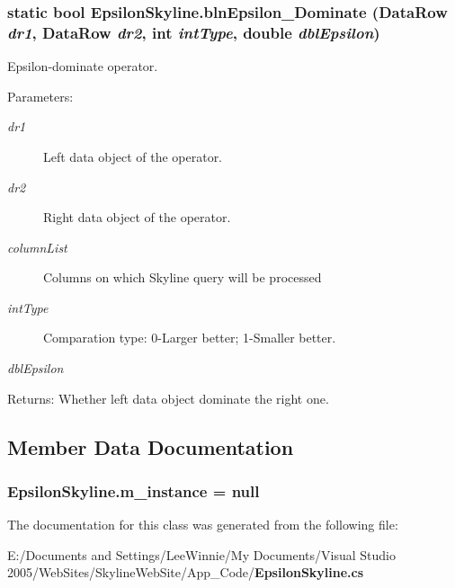 \subsubsection{\setlength{\rightskip}{0pt plus 5cm}static bool Epsilon\-Skyline.bln\-Epsilon\_\-Dominate (Data\-Row {\em dr1}, Data\-Row {\em dr2}, int {\em int\-Type}, double {\em dbl\-Epsilon})\hspace{0.3cm}{\tt  [static, private]}}\label{class_epsilon_skyline_ce1fce86298a280391417e7eb4490f41}


Epsilon-dominate operator. 

\begin{Desc}
\item[Parameters:]
\begin{description}
\item[{\em dr1}]Left data object of the operator.\item[{\em dr2}]Right data object of the operator.\item[{\em column\-List}]Columns on which Skyline query will be processed\item[{\em int\-Type}]Comparation type: 0-Larger better; 1-Smaller better.\item[{\em dbl\-Epsilon}]\end{description}
\end{Desc}
\begin{Desc}
\item[Returns:]Whether left data object dominate the right one.\end{Desc}


\subsection{Member Data Documentation}
\subsubsection{ {\bf Epsilon\-Skyline.m\_\-instance} = null\hspace{0.3cm}{\tt  [static, private]}}\label{class_epsilon_skyline_e65a7a116dc7a5231a460c20a69fb9de}




The documentation for this class was generated from the following file:\begin{CompactItemize}
\item 
E:/Documents and Settings/Lee\-Winnie/My Documents/Visual Studio 2005/Web\-Sites/Skyline\-Web\-Site/App\_\-Code/{\bf Epsilon\-Skyline.cs}\end{CompactItemize}
